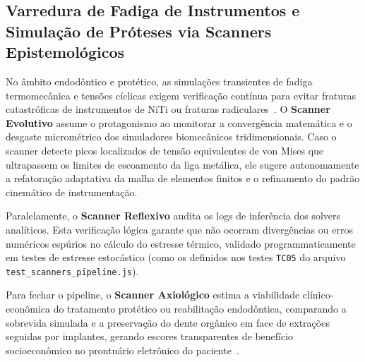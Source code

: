 \subsection{Varredura de Fadiga de Instrumentos e Simulação de Próteses via Scanners Epistemológicos}

No âmbito endodôntico e protético, as simulações transientes de fadiga termomecânica e tensões cíclicas exigem verificação contínua para evitar fraturas catastróficas de instrumentos de NiTi ou fraturas radiculares~\cite{elsaid2025digital}. O \textbf{Scanner Evolutivo} assume o protagonismo ao monitorar a convergência matemática e o desgaste micrométrico dos simuladores biomecânicos tridimensionais. Caso o scanner detecte picos localizados de tensão equivalentes de von Mises que ultrapassem os limites de escoamento da liga metálica, ele sugere autonomamente a refatoração adaptativa da malha de elementos finitos e o refinamento do padrão cinemático de instrumentação.

Paralelamente, o \textbf{Scanner Reflexivo} audita os logs de inferência dos solvers analíticos. Esta verificação lógica garante que não ocorram divergências ou erros numéricos espúrios no cálculo do estresse térmico, validado programmaticamente em testes de estresse estocástico (como os definidos nos testes \texttt{TC05} do arquivo \texttt{test\_scanners\_pipeline.js}). 

Para fechar o pipeline, o \textbf{Scanner Axiológico} estima a viabilidade clínico-econômica do tratamento protético ou reabilitação endodôntica, comparando a sobrevida simulada e a preservação do dente orgânico em face de extrações seguidas por implantes, gerando escores transparentes de benefício socioeconômico no prontuário eletrônico do paciente~\cite{roy2025applications}.
